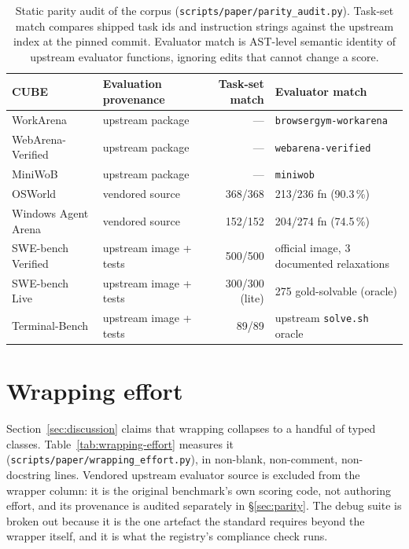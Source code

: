 \documentclass{article}
\newcommand{\NA}{\textcolor{gray!60}{---}}   %
\begin{document}
\begin{table}[h]
\centering
\caption{Static parity audit of the corpus (\texttt{scripts/paper/parity\_audit.py}).
Task-set match compares shipped task ids and instruction strings against the
upstream index at the pinned commit. Evaluator match is AST-level semantic
identity of upstream evaluator functions, ignoring edits that cannot change a
score.}
\label{tab:parity}
\small
\setlength{\tabcolsep}{5pt}
\renewcommand{\arraystretch}{1.05}
\begin{tabular}{llrl}
\toprule
\textbf{CUBE} & \textbf{Evaluation provenance} & \textbf{Task-set match} & \textbf{Evaluator match} \\
\midrule
WorkArena           & upstream package & \NA & \texttt{browsergym-workarena} \\
WebArena-Verified   & upstream package & \NA & \texttt{webarena-verified} \\
MiniWoB             & upstream package & \NA & \texttt{miniwob} \\
OSWorld             & vendored source  & 368/368 & 213/236 fn (90.3\,\%) \\
Windows Agent Arena & vendored source  & 152/152 & 204/274 fn (74.5\,\%) \\
SWE-bench Verified  & upstream image + tests & 500/500 & official image, 3 documented relaxations \\
SWE-bench Live      & upstream image + tests & 300/300 (lite) & 275 gold-solvable (oracle) \\
Terminal-Bench      & upstream image + tests & 89/89 & upstream \texttt{solve.sh} oracle \\
\bottomrule
\end{tabular}
\end{table}

\section{Wrapping effort}
\label{apdx:wrapping-effort}

Section~\ref{sec:discussion} claims that wrapping collapses to a handful of
typed classes. Table~\ref{tab:wrapping-effort} measures it
(\texttt{scripts/paper/wrapping\_effort.py}), in non-blank, non-comment,
non-docstring lines. Vendored upstream evaluator source is excluded from the
wrapper column: it is the original benchmark's own scoring code, not authoring
effort, and its provenance is audited separately in \S\ref{sec:parity}. The
debug suite is broken out because it is the one artefact the standard requires
beyond the wrapper itself, and it is what the registry's compliance check runs.
\end{document}
